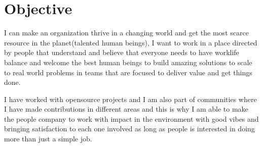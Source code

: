 \section{Objective}

I can make an organization thrive in a changing world and get the
most scarce resource in the planet(talented human beings), I want to work
in a place directed by people that understand and believe that everyone needs
to have worklife balance and welcome the best human beings to build amazing
solutions to scale to real world problems in teams that are focused to
deliver value and get things done.

I have worked with opensource projects and I am also part of communities
where I have made contributions in different areas and this is why I am
able to make the people company to work with impact in the environment with
good vibes and bringing satisfaction to each one involved as long as people
is interested in doing more than just a simple job.
